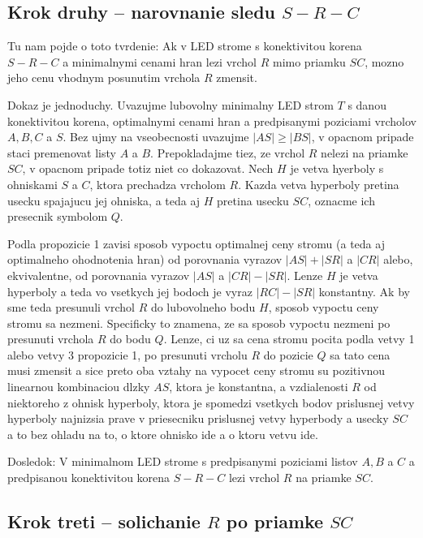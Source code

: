 \documentclass[12pt]{book}
\begin{document}
\subsection{Krok druhy -- narovnanie sledu $S-R-C$}

Tu nam pojde o toto tvrdenie:
Ak v LED strome s konektivitou korena $S-R-C$ a minimalnymi cenami hran
    lezi vrchol $R$ mimo priamku $SC$, mozno jeho cenu vhodnym posunutim
    vrchola $R$ zmensit.

Dokaz je jednoduchy.
Uvazujme lubovolny minimalny LED strom $T$ s danou konektivitou korena,
    optimalnymi cenami hran a predpisanymi poziciami vrcholov $A,B,C$ a $S$.
Bez ujmy na vseobecnosti uvazujme $|AS|\ge|BS|$, v opacnom pripade staci
    premenovat listy $A$ a $B$.
Prepokladajme tiez, ze vrchol $R$ nelezi na priamke $SC$, v opacnom pripade
    totiz niet co dokazovat.
Nech $H$ je vetva hyerboly s ohniskami $S$ a $C$, ktora prechadza vrcholom $R$.
Kazda vetva hyperboly pretina usecku spajajucu jej ohniska, a teda aj $H$
    pretina usecku $SC$, oznacme ich presecnik symbolom $Q$.

Podla propozicie 1 zavisi sposob vypoctu optimalnej ceny stromu (a teda aj
    optimalneho ohodnotenia hran) od porovnania vyrazov $|AS|+|SR|$ a $|CR|$
    alebo, ekvivalentne, od porovnania vyrazov $|AS|$ a $|CR|-|SR|$.
Lenze $H$ je vetva hyperboly a teda vo vsetkych jej bodoch je vyraz $|RC|-|SR|$
    konstantny.
Ak by sme teda presunuli vrchol $R$ do lubovolneho bodu $H$, sposob vypoctu
    ceny stromu sa nezmeni.
Specificky to znamena, ze sa sposob vypoctu nezmeni po presunuti vrchola $R$
    do bodu $Q$.
Lenze, ci uz sa cena stromu pocita podla vetvy 1 alebo vetvy 3 propozicie 1, po
    presunuti vrcholu $R$ do pozicie $Q$ sa tato cena musi zmensit a sice
    preto oba vztahy na vypocet ceny stromu su pozitivnou linearnou kombinaciou
    dlzky $AS$, ktora je konstantna, a vzdialenosti $R$ od niektoreho z ohnisk
    hyperboly, ktora je spomedzi vsetkych bodov prislusnej vetvy hyperboly
    najnizsia prave v priesecniku prislusnej vetvy hyperbody a usecky $SC$ a
    to bez ohladu na to, o ktore ohnisko ide a o ktoru vetvu ide.

Dosledok:
V minimalnom LED strome s predpisanymi poziciami listov $A,B$ a $C$ a
    predpisanou konektivitou korena $S-R-C$ lezi vrchol $R$ na priamke $SC$.

\subsection{Krok treti -- solichanie $R$ po priamke $SC$}
\end{document}
